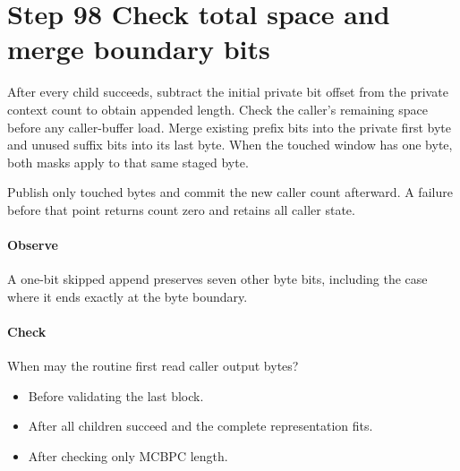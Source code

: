 \section{Step 98 Check total space and merge boundary bits}\label{h263-syntax-s08}
After every child succeeds, subtract the initial private bit offset from the
private context count to obtain appended length. Check the caller's remaining
space before any caller-buffer load. Merge existing prefix bits into the private
first byte and unused suffix bits into its last byte. When the touched window
has one byte, both masks apply to that same staged byte.

Publish only touched bytes and commit the new caller count afterward. A failure
before that point returns count zero and retains all caller state.

\paragraph{Observe} A one-bit skipped append preserves seven other byte bits,
including the case where it ends exactly at the byte boundary.
\paragraph{Check} When may the routine first read caller output bytes?
\begin{itemize}
  \item[A.] Before validating the last block.
  \item[B.] After all children succeed and the complete representation fits.
  \item[C.] After checking only MCBPC length.
\end{itemize}
